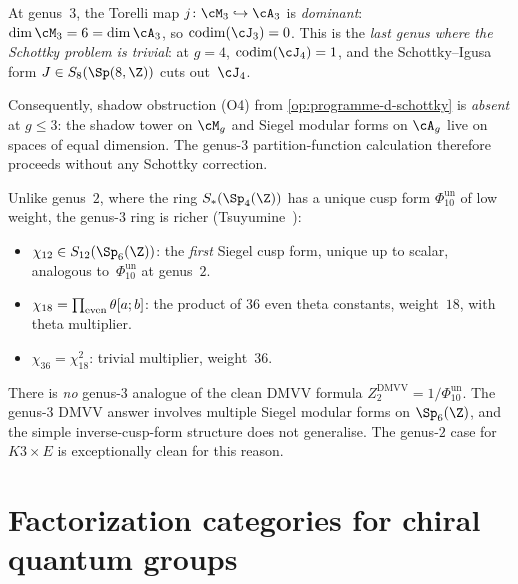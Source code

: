 \begin{remark}
\label{rem:schottky-genus3}
At genus~$3$, the Torelli map $j \colon \cM_3 \hookrightarrow \cA_3$ is
\emph{dominant}: $\dim \cM_3 = 6 = \dim \cA_3$, so
$\mathrm{codim}(\cJ_3) = 0$. This is the \emph{last genus where the Schottky
problem is trivial}: at $g = 4$, $\mathrm{codim}(\cJ_4) = 1$, and the
Schottky--Igusa form $J \in S_8(\Sp(8, \Z))$ cuts out~$\cJ_4$.

Consequently, shadow obstruction (O4) from
\ref{op:programme-d-schottky}
is \emph{absent} at $g \leq 3$: the shadow tower on $\cM_g$ and Siegel
modular forms on $\cA_g$ live on spaces of equal dimension. The
genus-$3$ partition-function calculation therefore proceeds without any
Schottky correction.
\end{remark}

\begin{remark}
\label{rem:genus3-siegel-landscape}
Unlike genus~$2$, where the ring $S_*(\Sp_4(\Z))$ has a unique cusp form
$\Phi_{10}^{\mathrm{un}}$ of low weight, the genus-$3$ ring is richer
(Tsuyumine~\cite{Tsuyumine86}):
\begin{itemize}
 \item $\chi_{12} \in S_{12}(\Sp_6(\Z))$: the \emph{first} Siegel cusp form,
 unique up to scalar, analogous to~$\Phi_{10}^{\mathrm{un}}$ at genus~$2$.
 \item $\chi_{18} = \prod_{\textup{even}} \theta[a;b]$: the product of $36$
 even theta constants, weight~$18$, with theta multiplier.
 \item $\chi_{36} = \chi_{18}^2$: trivial multiplier, weight~$36$.
\end{itemize}
There is \emph{no} genus-$3$ analogue of the clean DMVV formula
$Z_2^{\mathrm{DMVV}} = 1/\Phi_{10}^{\mathrm{un}}$. The genus-$3$ DMVV answer involves
multiple Siegel modular forms on $\Sp_6(\Z)$, and the simple inverse-cusp-form
structure does not generalise. The genus-$2$ case for $K3 \times E$
is exceptionally clean for this reason.
\end{remark}


\section{Factorization categories for chiral quantum groups}
\label{sec:factorization-categories}


